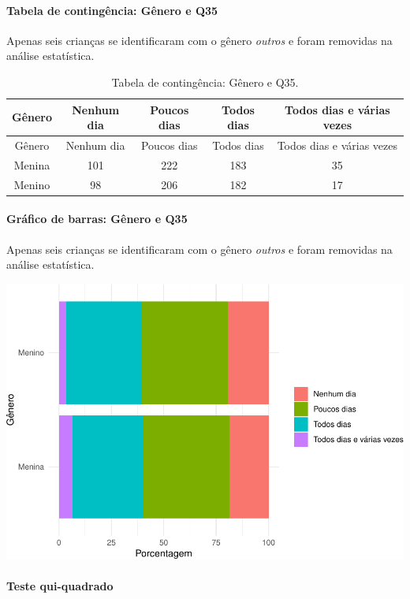 \documentclass[]{article}
\let\oldparagraph\paragraph
\renewcommand{\paragraph}[1]{\oldparagraph{#1}\mbox{}}
\begin{document}
\cleardoublepage

\hypertarget{tabela-de-continguxeancia-guxeanero-e-q35}{%
\paragraph{Tabela de contingência: Gênero e Q35}\label{tabela-de-continguxeancia-guxeanero-e-q35}}

Apenas seis crianças se identificaram com o gênero \emph{outros} e foram removidas na análise estatística.

\begin{longtable}[]{@{}ccccc@{}}
\caption{\label{tab:unnamed-chunk-1262}Tabela de contingência: Gênero e Q35.}\tabularnewline
\toprule
Gênero & Nenhum dia & Poucos dias & Todos dias & Todos dias e várias vezes\tabularnewline
\midrule
\endfirsthead
\toprule
Gênero & Nenhum dia & Poucos dias & Todos dias & Todos dias e várias vezes\tabularnewline
\midrule
\endhead
Menina & 101 & 222 & 183 & 35\tabularnewline
Menino & 98 & 206 & 182 & 17\tabularnewline
\bottomrule
\end{longtable}

\hypertarget{gruxe1fico-de-barras-guxeanero-e-q35}{%
\paragraph{Gráfico de barras: Gênero e Q35}\label{gruxe1fico-de-barras-guxeanero-e-q35}}

Apenas seis crianças se identificaram com o gênero \emph{outros} e foram removidas na análise estatística.

\begin{center}\includegraphics[width=0.75\linewidth]{relatorio_covid19_files/figure-latex/unnamed-chunk-1263-1} \end{center}

\hypertarget{teste-qui-quadrado-108}{%
\paragraph{Teste qui-quadrado}\label{teste-qui-quadrado-108}}
\end{document}

